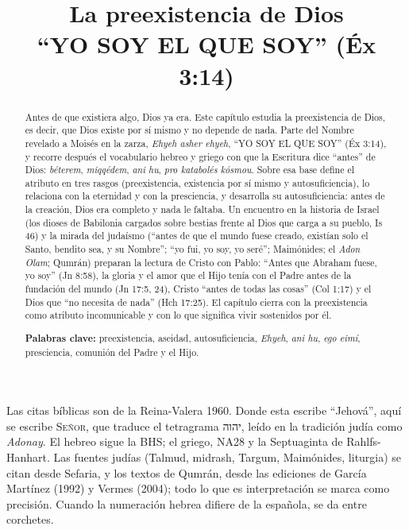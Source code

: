 \documentclass[11pt,letterpaper]{article}
\title{\color{azul}\bfseries La preexistencia de Dios\\[4pt]\large\color{gris}\mdseries ``YO SOY EL QUE SOY'' (Éx 3:14)}
\author{}\date{}
\newcommand{\heb}[1]{\mbox{\foreignlanguage{hebrew}{#1}}}
\newcommand{\SENOR}{\textsc{Señor}}
\begin{document}
\maketitle\thispagestyle{empty}

\begin{abstract}\noindent
Antes de que existiera algo, Dios ya era. Este capítulo estudia la preexistencia de Dios, es decir, que Dios existe por sí mismo y no depende de nada. Parte del Nombre revelado a Moisés en la zarza, \emph{Ehyeh asher ehyeh}, ``YO SOY EL QUE SOY'' (Éx 3:14), y recorre después el vocabulario hebreo y griego con que la Escritura dice ``antes'' de Dios: \emph{béterem}, \emph{miqqédem}, \emph{ani hu}, \emph{pro katabolés kósmou}. Sobre esa base define el atributo en tres rasgos (preexistencia, existencia por sí mismo y autosuficiencia), lo relaciona con la eternidad y con la presciencia, y desarrolla su autosuficiencia: antes de la creación, Dios era completo y nada le faltaba. Un encuentro en la historia de Israel (los dioses de Babilonia cargados sobre bestias frente al Dios que carga a su pueblo, Is 46) y la mirada del judaísmo (``antes de que el mundo fuese creado, existían solo el Santo, bendito sea, y su Nombre''; ``yo fui, yo soy, yo seré''; Maimónides; el \emph{Adon Olam}; Qumrán) preparan la lectura de Cristo con Pablo: ``Antes que Abraham fuese, yo soy'' (Jn 8:58), la gloria y el amor que el Hijo tenía con el Padre antes de la fundación del mundo (Jn 17:5, 24), Cristo ``antes de todas las cosas'' (Col 1:17) y el Dios que ``no necesita de nada'' (Hch 17:25). El capítulo cierra con la preexistencia como atributo incomunicable y con lo que significa vivir sostenidos por él.
\par\smallskip\noindent\textbf{Palabras clave:} preexistencia, aseidad, autosuficiencia, \emph{Ehyeh}, \emph{ani hu}, \emph{ego eimí}, presciencia, comunión del Padre y el Hijo.\end{abstract}

\begin{nota}
Las citas bíblicas son de la Reina-Valera 1960. Donde esta escribe ``Jehová'', aquí se escribe \SENOR, que traduce el tetragrama \heb{יהוה}, leído en la tradición judía como \emph{Adonay}. El hebreo sigue la BHS; el griego, NA28 y la Septuaginta de Rahlfs-Hanhart. Las fuentes judías (Talmud, midrash, Targum, Maimónides, liturgia) se citan desde Sefaria, y los textos de Qumrán, desde las ediciones de García Martínez (1992) y Vermes (2004); todo lo que es interpretación se marca como precisión. Cuando la numeración hebrea difiere de la española, se da entre corchetes.
\end{nota}
\end{document}
